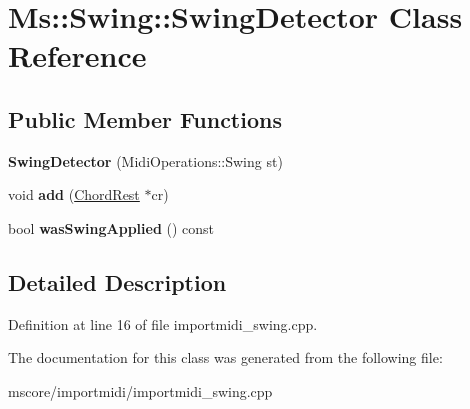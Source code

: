 \hypertarget{class_ms_1_1_swing_1_1_swing_detector}{}\section{Ms\+:\+:Swing\+:\+:Swing\+Detector Class Reference}
\label{class_ms_1_1_swing_1_1_swing_detector}
\subsection*{Public Member Functions}
\begin{DoxyCompactItemize}
\item 
\mbox{\label{class_ms_1_1_swing_1_1_swing_detector_a2adb6567d1feb4c22da5bbc7af28e9f8}} 
{\bfseries Swing\+Detector} (Midi\+Operations\+::\+Swing st)
\item 
\mbox{\label{class_ms_1_1_swing_1_1_swing_detector_a9fe37ed4df63c0b65076795dd58a49d7}} 
void {\bfseries add} (\hyperlink{class_ms_1_1_chord_rest}{Chord\+Rest} $\ast$cr)
\item 
\mbox{\label{class_ms_1_1_swing_1_1_swing_detector_a0208d3296acc7171c237aa36e8de0ccc}} 
bool {\bfseries was\+Swing\+Applied} () const
\end{DoxyCompactItemize}


\subsection{Detailed Description}


Definition at line 16 of file importmidi\+\_\+swing.\+cpp.



The documentation for this class was generated from the following file\+:\begin{DoxyCompactItemize}
\item 
mscore/importmidi/importmidi\+\_\+swing.\+cpp\end{DoxyCompactItemize}
